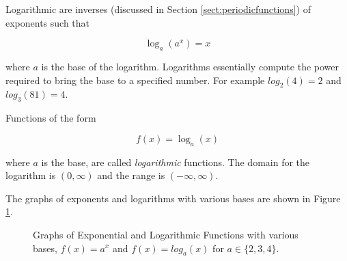         Logarithmic are inverses (discussed in Section \ref{sect:periodicfunctions}) of exponents such that

        \begin{equation}
            \log_a(a^x) = x
        \end{equation}

        \noindent where $a$ is the base of the logarithm. Logarithms essentially compute the power required to bring the base to a specified number. For example $log_2(4) = 2$ and $log_3(81) = 4$.

        \begin{definition}
            Functions of the form

            \begin{equation}
                f(x) = \log_a(x)
            \end{equation}

            where $a$ is the base, are called \textit{logarithmic} functions. The domain for the logarithm is $(0,\infty)$ and the range is $(-\infty,\infty)$.
        \end{definition}

        The graphs of exponents and logarithms with various bases are shown in Figure \ref{fig:exploggraphs}.

        \begin{figure}
            \centering
            \caption{Graphs of Exponential and Logarithmic Functions with various bases, $f(x) = a^x$ and $f(x) = log_a(x)$ for $a \in \{2,3,4\}$.}
            \label{fig:exploggraphs}
        \end{figure}

